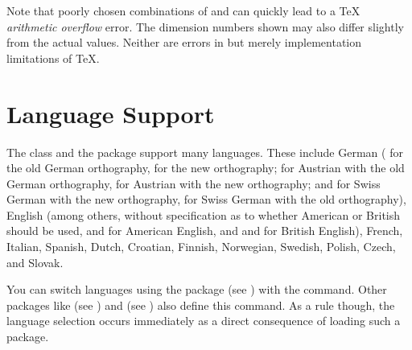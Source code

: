 Note that poorly chosen combinations of  and
 can quickly lead to a \TeX{} \emph{arithmetic overflow}
error. The dimension numbers shown may also differ slightly from the actual
values. Neither are errors in  but merely implementation
limitations of \TeX.
%
\EndIndexGroup
%
\EndIndexGroup
%
\EndIndexGroup


\section{Language Support}
%
\BeginIndexGroup
{}%

The  class and the  package support many
languages. These include German ( for
the old German orthography,  for the new orthography;
 for Austrian with the old German orthography,
 for Austrian with the
new orthography; and 
for Swiss German with the new orthography,  for Swiss
German with the old orthography), English (among
others,  without specification as to whether American or
British should be used,  and  for American
English, and  and  for British English),
French, Italian,
Spanish, Dutch,
Croatian, Finnish,
Norwegian,
Swedish,
Polish,
Czech, and Slovak.

You can switch languages using the  package
(see \cite{package:babel}) with the 
command.  Other packages like  (see
\cite{package:german}) and  (see
\cite{package:ngerman}) also define this command.  As a rule though, the
language selection occurs immediately as a direct consequence of loading such
a package.

